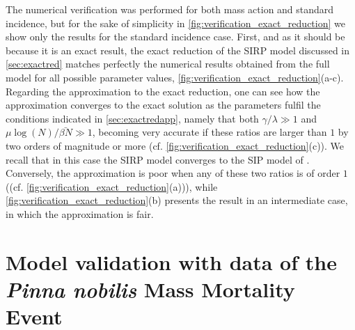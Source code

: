 The numerical verification was performed for both mass action and standard
incidence, but for the sake of simplicity in
\cref{fig:verification_exact_reduction} we show only the results for the
standard incidence case. First, and as it should be because it is an exact
result, the exact reduction of the SIRP model discussed in \cref{sec:exactred}
matches perfectly the numerical results obtained from the full model for all
possible parameter values,
\cref{fig:verification_exact_reduction}(a-c).
Regarding the approximation to the exact reduction, one can see
how the approximation converges to the exact solution as the parameters
fulfil the conditions indicated in \cref{sec:exactredapp}, namely that both
$\gamma/\lambda\gg 1$ and $\mu\log(N)/\bar{\beta N}\gg 1$, becoming very
accurate if these ratios are larger than $1$ by two orders of magnitude or more
(cf.  \cref{fig:verification_exact_reduction}(c)). We recall that in this case
the SIRP model converges to the SIP model of \cite{article_SIP}. Conversely,
the approximation is poor when any of these two ratios is of order $1$ ((cf.
\cref{fig:verification_exact_reduction}(a))), while
\cref{fig:verification_exact_reduction}(b) presents the result in an
intermediate case, in which the approximation is fair.

\section{Model validation with data of the \textit{Pinna nobilis} Mass
  Mortality Event}
\label{sec:validation}

